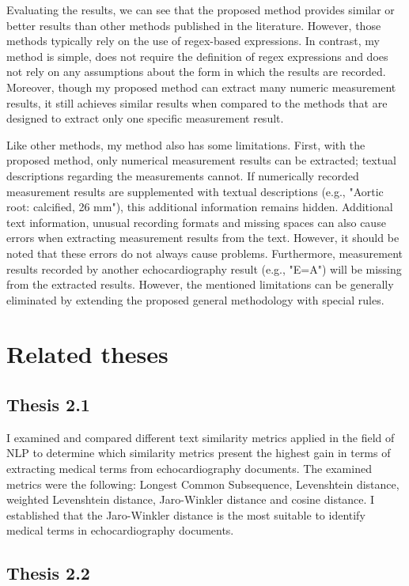 Evaluating the results, we can see that the proposed method provides similar or better results than other methods published in the literature. However, those methods typically rely on the use of regex-based expressions. In contrast, my method is simple, does not require the definition of regex expressions and does not rely on any assumptions about the form in which the results are recorded. Moreover, though my proposed method can extract many numeric measurement results, it still achieves similar results when compared to the methods that are designed to extract only one specific measurement result.

Like other methods, my method also has some limitations. First, with the proposed method, only numerical measurement results can be extracted; textual descriptions regarding the measurements cannot. If numerically recorded measurement results are supplemented with textual descriptions (e.g., "Aortic root: calcified, 26 mm"), this additional information remains hidden. Additional text information, unusual recording formats and missing spaces can also cause errors when extracting measurement results from the text. However, it should be noted that these errors do not always cause problems. Furthermore, measurement results recorded by another echocardiography result (e.g., "E=A") will be missing from the extracted results. However, the mentioned limitations can be generally eliminated by extending the proposed general methodology with special rules. 

\section{Related theses}

\subsection*{Thesis 2.1}

I examined and compared different text similarity metrics applied in the field of NLP to determine which similarity metrics present the highest gain in terms of extracting medical terms from echocardiography documents. The examined metrics were the following: Longest Common Subsequence, Levenshtein distance, weighted Levenshtein distance, Jaro-Winkler distance and cosine distance. I established that the Jaro-Winkler distance is the most suitable to identify medical terms in echocardiography documents.

\subsection*{Thesis 2.2}

